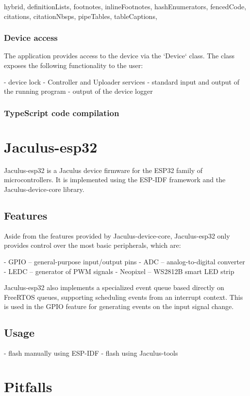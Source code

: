 \documentclass[
  digital,
  oneside,
  nosansbold,
  nocolorbold,
  lof,
  lot
]{fithesis4}
\begin{document}
\begin{markdown*}{%
  hybrid,
  definitionLists,
  footnotes,
  inlineFootnotes,
  hashEnumerators,
  fencedCode,
  citations,
  citationNbsps,
  pipeTables,
  tableCaptions,
}
\subsection{Device access}

The application provides access to the device via the `Device` class. The class exposes the following functionality to the user:

  - device lock
  - Controller and Uploader services
  - standard input and output of the running program
  - output of the device logger

\subsection{TypeScript code compilation}



\chapter{Jaculus-esp32}

Jaculus-esp32 is a Jaculus device firmware for the ESP32 family of microcontrollers. It is implemented using the ESP-IDF framework and the Jaculus-device-core library.

\section{Features}

Aside from the features provided by Jaculus-device-core, Jaculus-esp32 only provides control over the most basic peripherals, which are:

  - GPIO -- general-purpose input/output pins
  - ADC -- analog-to-digital converter
  - LEDC -- generator of PWM signals
  - Neopixel -- WS2812B smart LED strip

Jaculus-esp32 also implements a specialized event queue based directly on FreeRTOS queues, supporting scheduling events from an interrupt context. This is used in the GPIO feature for generating events on the input signal change.


\section{Usage}

  - flash manually using ESP-IDF
  - flash using Jaculus-tools


\chapter{Pitfalls}


\end{markdown*}
\end{document}

